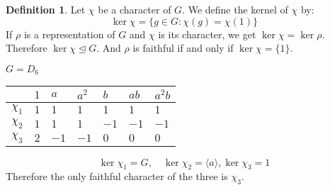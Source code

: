 \documentclass[11pt, notitlepage]{article}
\numberwithin{equation}{section}
\theoremstyle{plain}
\theoremstyle{definition}
\newtheorem{definition}[theorem]{Definition}
\newenvironment{example}
	{\pushQED{\qed}\renewcommand{\qedsymbol}{$\blacktriangleleft$}\examplex}
	{\popQED\endexamplex}
\begin{document}
\begin{definition}
	Let $\chi$ be a character of $G$. We define the kernel of $\chi$ by:
	\[
	\ker\chi = \{g\in G:\chi(g) = \chi(1)\}
	\]
	If $\rho$ is a representation of $G$ and $\chi$ is its character, we get $\ker\chi = \ker\rho$. Therefore $\ker\chi\unlhd G$. And $\rho$ is faithful if and only if $\ker\chi = \{1\}$.
\end{definition}
\begin{example}
	$G = D_6$

\begin{tabular}{l|l|l|l|l|l|l|}
	& $1$ & $a$  & $a^2$ & $b$  & $ab$ & $a^2b$  \\ 
	\hline
	$\chi_1$ & $1$ & $1$  & $1$   & $1$  & $1$  & $1$     \\ 
	\hline
	$\chi_2$ & $1$ & $1$  & $1$   & $-1$ & $-1$ & $-1$    \\ 
	\hline
	$\chi_3$ & $2$ & $-1$ & $-1$  & $0$  & $0$  & $0$     \\
	\hline
\end{tabular}
\[\ker\chi_1 = G,\quad \ker\chi_2 = \langle a\rangle, \ker\chi_3 = 1\]
Therefore the only faithful character of the three is $\chi_3$.
\end{example}
\end{document}
